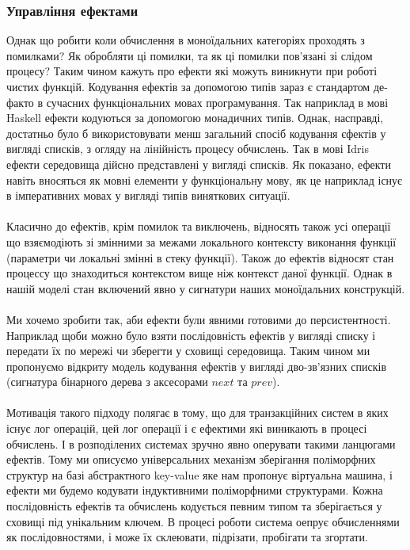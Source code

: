 \documentclass[11pt,oneside]{article}
\begin{document}
  \subsubsection{Управління ефектами}
   Однак що робити коли обчислення в моноїдальних категоріях проходять з помилками?
   Як обробляти ці помилки, та як ці помилки пов’язані зі слідом процесу? Таким чином кажуть
   про ефекти які можуть виникнути при роботі чистих функцій.
   Кодування ефектів за допомогою типів зараз є стандартом
   де-факто в сучасних функціональних мовах програмування. Так наприклад в мові Haskell ефекти кодуються
   за допомогою монадичних типів. Однак, насправді, достатньо було б використовувати менш загальний спосіб
   кодування єфектів у вигляді списків, з огляду на лінійність процесу обчислень. Так в мові Idris
   ефекти середовища дійсно представлені у вигляді списків. Як показано\cite{baer}, ефекти
   навіть вносяться як мовні елементи у функціональну мову, як це наприклад існує
   в імперативних мовах у вигляді типів виняткових ситуації.

   \paragraph{}
   Класично до ефектів, крім помилок та виключень, відносять також усі
   операції що взяємодіють зі змінними за межами локального контексту
   виконання функції (параметри чи локальні змінні в стеку функції).
   Також до ефектів відносят стан процессу що знаходиться контекстом
   вище ніж контекст даної функції. Однак в нашій моделі стан включений
   явно у сигнатури наших моноїдальних конструкцій.

   \paragraph{}
   Ми хочемо зробити так, аби ефекти були явними готовими до персистентності.
   Наприклад щоби можно було взяти послідовність ефектів у вигляді списку і
   передати їх по мережі чи зберегти у сховищі середовища. Таким чином ми
   пропонуємо відкриту модель кодування ефектів у вигляді дво-зв’язних
   списків (сигнатура бінарного дерева з аксесорами $next$ та $prev$).

   \paragraph{}
   Мотивація такого підходу полягає в тому, що для транзакційних систем
   в яких існує лог операцій, цей лог операції і є ефектими які виникають в процесі обчислень.
   І в розподілених системах зручно явно оперувати такими ланцюгами ефектів.
   Тому ми описуємо універсальних механізм зберігання поліморфних структур
   на базі абстрактного key-value яке нам пропонує віртуальна машина, і ефекти
   ми будемо кодувати індуктивними поліморфними структурами. Кожна послідовність ефектів та обчислень
   кодується певним типом та зберігається у сховищі під унікальним ключем. В процесі роботи
   система оепрує обчисленнями як послідовностями, і може їх склеювати, підрізати,
   пробігати та згортати.
\end{document}
